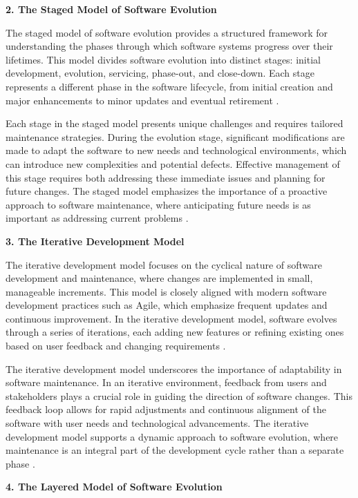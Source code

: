 \begin{refsection}
\textbf{2. The Staged Model of Software Evolution}

The staged model of software evolution provides a structured framework for understanding the phases through which software systems progress over their lifetimes. This model divides software evolution into distinct stages: initial development, evolution, servicing, phase-out, and close-down. Each stage represents a different phase in the software lifecycle, from initial creation and major enhancements to minor updates and eventual retirement \cite[pp.~199-201]{bennett2002software}.

Each stage in the staged model presents unique challenges and requires tailored maintenance strategies. During the evolution stage, significant modifications are made to adapt the software to new needs and technological environments, which can introduce new complexities and potential defects. Effective management of this stage requires both addressing these immediate issues and planning for future changes. The staged model emphasizes the importance of a proactive approach to software maintenance, where anticipating future needs is as important as addressing current problems \cite[pp.~201-203]{bennett2002software}.

\textbf{3. The Iterative Development Model}

The iterative development model focuses on the cyclical nature of software development and maintenance, where changes are implemented in small, manageable increments. This model is closely aligned with modern software development practices such as Agile, which emphasize frequent updates and continuous improvement. In the iterative development model, software evolves through a series of iterations, each adding new features or refining existing ones based on user feedback and changing requirements \cite[pp.~273-275]{larman2003agile}.

The iterative development model underscores the importance of adaptability in software maintenance. In an iterative environment, feedback from users and stakeholders plays a crucial role in guiding the direction of software changes. This feedback loop allows for rapid adjustments and continuous alignment of the software with user needs and technological advancements. The iterative development model supports a dynamic approach to software evolution, where maintenance is an integral part of the development cycle rather than a separate phase \cite[pp.~275-277]{larman2003agile}.

\textbf{4. The Layered Model of Software Evolution}


\end{refsection}
